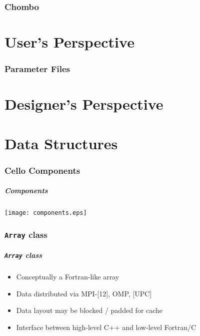 \documentclass{beamer}
\newcommand{\code}[1]{\texttt{#1}}
\begin{document}
\section{Chombo}

\part{User's Perspective}

\section{Parameter Files}


\part{Designer's Perspective}

\part{Data Structures}

\section{Cello Components}

\begin{frame}
\frametitle{Components}
\centerline{\texttt{[image: components.eps]}}
\end{frame}

\section{\code{Array} class}

\begin{frame}
\frametitle{\code{Array} class}

\begin{itemize}
\item Conceptually a Fortran-like array
\item Data distributed via MPI-[12], OMP, [UPC]
\item Data layout may be blocked / padded for cache
\item Interface between high-level C++ and low-level Fortran/C
\end{itemize}
\end{frame}
\end{document}
